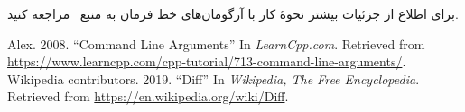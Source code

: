 \documentclass{utap}
\begin{document}
    برای اطلاع از جزئیات بیشتر نحوهٔ کار با آرگومان‌های خط فرمان به منبع~\cite{learncpp-commandlineargs} مراجعه کنید.

    \begin{thebibliography}{9}
    \latin
     Alex. 2008. ``Command Line Arguments'' In \textit{LearnCpp.com}. Retrieved from \url{https://www.learncpp.com/cpp-tutorial/713-command-line-arguments/}.
     Wikipedia contributors. 2019. ``Diff'' In \textit{Wikipedia, The Free Encyclopedia}. Retrieved from \url{https://en.wikipedia.org/wiki/Diff}.
    \end{thebibliography}
\end{document}
